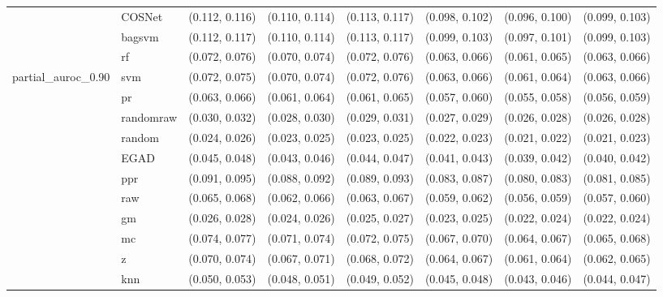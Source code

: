 \begin{table}[H]
{\begin{tabular}{llllllll}
 & COSNet & (0.112, 0.116) & (0.110, 0.114) & (0.113, 0.117) & (0.098, 0.102) & (0.096, 0.100) & (0.099, 0.103)\\

 & bagsvm & (0.112, 0.117) & (0.110, 0.114) & (0.113, 0.117) & (0.099, 0.103) & (0.097, 0.101) & (0.099, 0.103)\\

 & rf & (0.072, 0.076) & (0.070, 0.074) & (0.072, 0.076) & (0.063, 0.066) & (0.061, 0.065) & (0.063, 0.066)\\

\multirow{-15}{*}{\raggedright\arraybackslash partial\_auroc\_0.90} & svm & (0.072, 0.075) & (0.070, 0.074) & (0.072, 0.076) & (0.063, 0.066) & (0.061, 0.064) & (0.063, 0.066)\\
\cmidrule{1-8}
 & pr & (0.063, 0.066) & (0.061, 0.064) & (0.061, 0.065) & (0.057, 0.060) & (0.055, 0.058) & (0.056, 0.059)\\

 & randomraw & (0.030, 0.032) & (0.028, 0.030) & (0.029, 0.031) & (0.027, 0.029) & (0.026, 0.028) & (0.026, 0.028)\\

 & random & (0.024, 0.026) & (0.023, 0.025) & (0.023, 0.025) & (0.022, 0.023) & (0.021, 0.022) & (0.021, 0.023)\\

 & EGAD & (0.045, 0.048) & (0.043, 0.046) & (0.044, 0.047) & (0.041, 0.043) & (0.039, 0.042) & (0.040, 0.042)\\

 & ppr & (0.091, 0.095) & (0.088, 0.092) & (0.089, 0.093) & (0.083, 0.087) & (0.080, 0.083) & (0.081, 0.085)\\

 & raw & (0.065, 0.068) & (0.062, 0.066) & (0.063, 0.067) & (0.059, 0.062) & (0.056, 0.059) & (0.057, 0.060)\\

 & gm & (0.026, 0.028) & (0.024, 0.026) & (0.025, 0.027) & (0.023, 0.025) & (0.022, 0.024) & (0.022, 0.024)\\

 & mc & (0.074, 0.077) & (0.071, 0.074) & (0.072, 0.075) & (0.067, 0.070) & (0.064, 0.067) & (0.065, 0.068)\\

 & z & (0.070, 0.074) & (0.067, 0.071) & (0.068, 0.072) & (0.064, 0.067) & (0.061, 0.064) & (0.062, 0.065)\\

 & knn & (0.050, 0.053) & (0.048, 0.051) & (0.049, 0.052) & (0.045, 0.048) & (0.043, 0.046) & (0.044, 0.047)\\


\end{tabular}}
\end{table}
